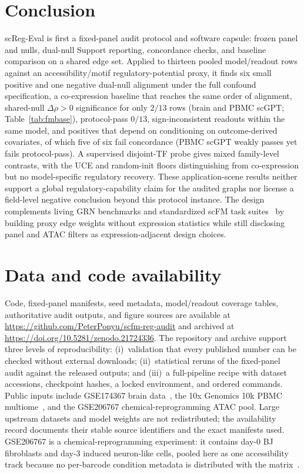 \documentclass[fleqn,10pt,lineno]{wlpeerj}
\begin{document}
\section{Conclusion}
scReg-Eval is first a fixed-panel audit protocol and software capsule: frozen panel and
nulls, dual-null Support reporting, concordance checks, and baseline comparison on a shared edge
set. Applied to thirteen pooled model/readout rows against an accessibility/motif
regulatory-potential proxy, it finds six small positive and one negative dual-null alignment under
the full confound specification, a co-expression baseline that reaches the same order of alignment,
shared-null $\Delta\rho>0$ significance for only $2/13$ rows (brain and PBMC scGPT;
Table~\ref{tab:fmbase}), protocol-pass $0/13$, sign-inconsistent readouts within the same model,
and positives that depend on conditioning on outcome-derived covariates, of which five of six fail
concordance (PBMC scGPT weakly passes yet fails protocol-pass). A supervised disjoint-TF probe
gives mixed family-level contrasts, with the UCE and random-init floors distinguishing from
co-expression but no model-specific regulatory recovery. These application-scene results neither
support a global regulatory-capability claim for the audited graphs nor license a field-level
negative conclusion beyond this protocol instance. The design complements living GRN benchmarks
and standardized scFM task suites~\citep{nourisa2025genernib,qiu2025biollm} by building proxy edge
weights without expression statistics while still disclosing panel and ATAC filters as
expression-adjacent design choices.

\FloatBarrier
\section*{Data and code availability}
Code, fixed-panel manifests, seed metadata, model/readout coverage tables, authoritative audit
outputs, and figure sources are available at
\url{https://github.com/PeterPonyu/scfm-reg-audit} and archived at
\url{https://doi.org/10.5281/zenodo.21724336}. The repository and archive support three levels of
reproducibility: (i)~validation that every published number can be checked without external
downloads; (ii)~statistical reruns of the fixed-panel audit against the released outputs; and
(iii)~a full-pipeline recipe with dataset accessions, checkpoint hashes, a locked environment, and
ordered commands. Public inputs include GSE174367 brain data~\citep{morabito2021gse174367}, the 10x
Genomics 10k PBMC multiome~\citep{tenx_pbmc_multiome}, and the GSE206767 chemical-reprogramming ATAC
pool. Large upstream datasets and model weights are not redistributed; the availability record
documents their stable source identifiers and the exact manifests used. GSE206767 is a
chemical-reprogramming experiment: it contains day-0 BJ fibroblasts and day-3 induced neuron-like
cells, pooled here as one accessibility track because no per-barcode condition metadata is
distributed with the matrix~\citep{gse206767}.
\end{document}
